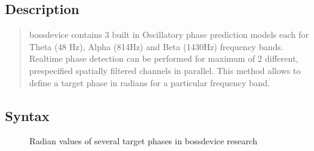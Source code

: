 \documentclass[letterpaper,10pt,english]{sphinxmanual}
\begin{document}
\subsection{Description}
\label{\detokenize{4_api_documentation:id23}}\begin{quote}

bossdevice contains 3 built in Oscillatory phase prediction models each for Theta (4\sphinxhyphen{}8 Hz), Alpha (8\sphinxhyphen{}14Hz) and Beta (14\sphinxhyphen{}30Hz) frequency bands. Real\sphinxhyphen{}time phase detection can be performed for maximum of 2 different, pre\sphinxhyphen{}specified spatially filtered channels in parallel. This method allows to define a target phase in radians for a particular frequency band.
\end{quote}


\subsection{Syntax}
\label{\detokenize{4_api_documentation:id24}}
\begin{sphinxVerbatim}[commandchars=\\\{\}]
\PYG{p}{[}\PYG{p}{]} 
\PYG{p}{[}\PYG{p}{]} 
\PYG{p}{[}\PYG{p}{]} 
\end{sphinxVerbatim}

\begin{figure}[htbp]
\centering
\capstart

\noindent{}
\caption{Radian values of several target phases in bossdevice research}\label{\detokenize{4_api_documentation:id51}}\end{figure}
\end{document}
